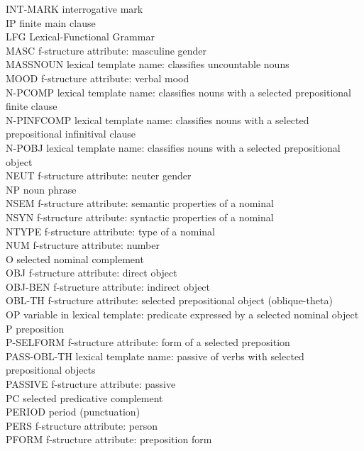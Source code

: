 \documentclass[output=paper]{langsci/langscibook}
\begin{document}
\begin{tabbing}
INT-MARK \> interrogative mark\\
IP \> finite main clause\\
LFG \> Lexical-Functional Grammar\\
MASC \> f-structure attribute: masculine gender\\
MASSNOUN \> lexical template name: classifies uncountable nouns\\
MOOD \> f-structure attribute: verbal mood\\
N-PCOMP \> lexical template name: classifies nouns with a selected prepositional finite clause\\
N-PINFCOMP \> lexical template name: classifies nouns with a selected prepositional infinitival clause\\
N-POBJ \> lexical template name: classifies nouns with a selected prepositional object\\
NEUT \> f-structure attribute: neuter gender\\
NP \> noun phrase\\
NSEM \> f-structure attribute: semantic properties of a nominal\\
NSYN \> f-structure attribute: syntactic properties of a nominal\\
NTYPE \> f-structure attribute: type of a nominal\\
NUM \> f-structure attribute: number\\
O \> selected nominal complement\\
OBJ \> f-structure attribute: direct object\\
OBJ-BEN \> f-structure attribute: indirect object\\
OBL-TH \> f-structure attribute: selected prepositional object (oblique-theta)\\
OP \> variable in lexical template: predicate expressed by a selected nominal object\\
P \> preposition\\
P-SELFORM \> f-structure attribute: form of a selected preposition\\
PASS-OBL-TH \> lexical template name: passive of verbs with selected prepositional objects\\
PASSIVE \> f-structure attribute: passive\\
PC \> selected predicative complement\\
PERIOD \> period (punctuation)\\
PERS \> f-structure attribute: person\\
PFORM \> f-structure attribute: preposition form\\

\end{tabbing}
\end{document}
